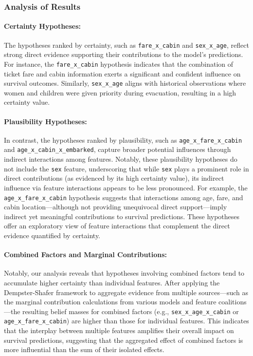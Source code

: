 \documentclass[acmlarge]{acmart}
\begin{document}
\subsubsection{Analysis of Results}

\paragraph{Certainty Hypotheses:}  
The hypotheses ranked by certainty, such as \texttt{fare\_x\_cabin} and \texttt{sex\_x\_age}, reflect strong direct evidence supporting their contributions to the model's predictions. For instance, the \texttt{fare\_x\_cabin} hypothesis indicates that the combination of ticket fare and cabin information exerts a significant and confident influence on survival outcomes. Similarly, \texttt{sex\_x\_age} aligns with historical observations where women and children were given priority during evacuation, resulting in a high certainty value.

\paragraph{Plausibility Hypotheses:}  
In contrast, the hypotheses ranked by plausibility, such as \texttt{age\_x\_fare\_x\_cabin} and \texttt{age\_x\_cabin\_x\_embarked}, capture broader potential influences through indirect interactions among features. Notably, these plausibility hypotheses do not include the \texttt{sex} feature, underscoring that while \texttt{sex} plays a prominent role in direct contributions (as evidenced by its high certainty value), its indirect influence via feature interactions appears to be less pronounced. For example, the \texttt{age\_x\_fare\_x\_cabin} hypothesis suggests that interactions among age, fare, and cabin location—although not providing unequivocal direct support—imply indirect yet meaningful contributions to survival predictions. These hypotheses offer an exploratory view of feature interactions that complement the direct evidence quantified by certainty.



\paragraph{Combined Factors and Marginal Contributions:}  
Notably, our analysis reveals that hypotheses involving combined factors tend to accumulate higher certainty than individual features. After applying the Dempster-Shafer framework to aggregate evidence from multiple sources—such as the marginal contribution calculations from various models and feature coalitions—the resulting belief masses for combined factors (e.g., \texttt{sex\_x\_age\_x\_cabin} or \texttt{age\_x\_fare\_x\_cabin}) are higher than those for individual features. This indicates that the interplay between multiple features amplifies their overall impact on survival predictions, suggesting that the aggregated effect of combined factors is more influential than the sum of their isolated effects.
\end{document}
